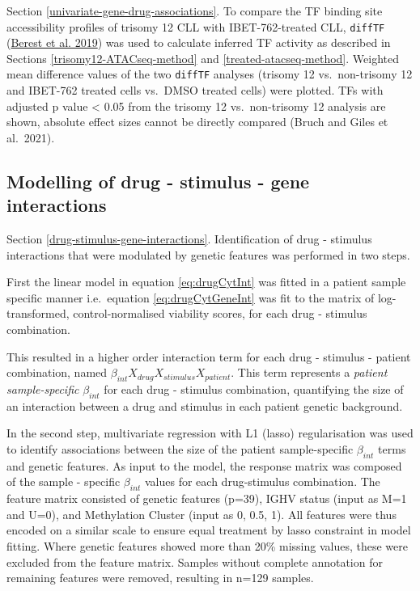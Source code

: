 \documentclass[11pt, a4paper, twosided]{book}
\begin{document}
Section \ref{univariate-gene-drug-associations}. To compare the TF binding site accessibility profiles of trisomy 12 CLL with IBET-762-treated CLL, \texttt{diffTF} (\protect\hyperlink{ref-Berest2019}{Berest et al. 2019}) was used to calculate inferred TF activity as described in Sections \ref{trisomy12-ATACseq-method} and \ref{treated-atacseq-method}. Weighted mean difference values of the two \texttt{diffTF} analyses (trisomy 12 vs.~non-trisomy 12 and IBET-762 treated cells vs.~DMSO treated cells) were plotted. TFs with adjusted p value \textless{} 0.05 from the trisomy 12 vs.~non-trisomy 12 analysis are shown, absolute effect sizes cannot be directly compared (Bruch and Giles et al.~2021).

\hypertarget{drug-stimulus-gene-interactions-method}{%
\subsection{Modelling of drug - stimulus - gene interactions}\label{drug-stimulus-gene-interactions-method}}

Section \ref{drug-stimulus-gene-interactions}. Identification of drug - stimulus interactions that were modulated by genetic features was performed in two steps.

First the linear model in equation \eqref{eq:drugCytInt} was fitted in a patient sample specific manner i.e.~equation \eqref{eq:drugCytGeneInt} was fit to the matrix of log-transformed, control-normalised viability scores, for each drug - stimulus combination.

This resulted in a higher order interaction term for each drug - stimulus - patient combination, named \(\beta_{int}X_{drug}X_{stimulus}X_{patient}\). This term represents a \emph{patient sample-specific} \(\beta_{int}\) for each drug - stimulus combination, quantifying the size of an interaction between a drug and stimulus in each patient genetic background.

In the second step, multivariate regression with L1 (lasso) regularisation was used to identify associations between the size of the patient sample-specific \(\beta_{int}\) terms and genetic features. As input to the model, the response matrix was composed of the sample - specific \(\beta_{int}\) values for each drug-stimulus combination. The feature matrix consisted of genetic features (p=39), IGHV status (input as M=1 and U=0), and Methylation Cluster (input as 0, 0.5, 1). All features were thus encoded on a similar scale to ensure equal treatment by lasso constraint in model fitting. Where genetic features showed more than 20\% missing values, these were excluded from the feature matrix. Samples without complete annotation for remaining features were removed, resulting in n=129 samples.
\end{document}
